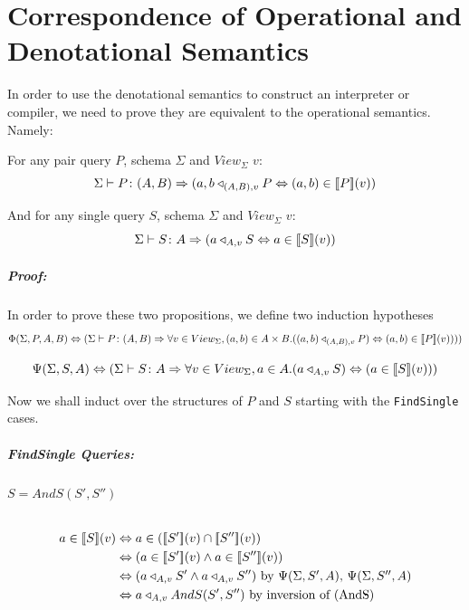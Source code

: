 \documentclass[12pt,a4paper,twoside,openright]{report}
\newcommand\codeName[1]{\texttt{#1}}
\newcommand{\db}[1]{{\bf [\![}#1{\bf ]\!]}}
\newcommand{\deno}[1]{\db{#1}(v)}
\newcommand{\typeRule}[2]{\Sigma\vdash #1 \colon #2}
\newcommand{\denoRule}[2]{#1 \in \deno{#2}}
\newcommand{\opRule}[3]{#1 \triangleleft_{#2, v} #3}
\newcommand{\phiRule}[3]{\Phi(\Sigma, #1, #2, #3)}
\newcommand{\psiRule}[2]{\Psi(\Sigma, #1, #2)}
\begin{document}
\prevdepth\tpd

\chapter{Correspondence of Operational and Denotational Semantics}
\label{DenoOper}
In order to use the denotational semantics to construct an interpreter or compiler, we need to prove they are equivalent to the operational semantics. Namely:

For any pair query $P$, schema $\Sigma$ and $View_{\Sigma}$ $v$:
\[
\typeRule{P}{(A, B)}\Rightarrow \opRule{(a, b}{(A, B)}{P} \Leftrightarrow \denoRule{(a, b)}{P})
\]

And for any single query $S$, schema $\Sigma$ and $View_{\Sigma}$ $v$: 
\[
\typeRule{S}{A}\Rightarrow \opRule{(a}{A}{S} \Leftrightarrow \denoRule{a}{S})
\]

\paragraph{Proof: }In order to prove these two propositions, we define two induction hypotheses
\[
\phiRule{P}{A}{B} \Leftrightarrow (\typeRule{P}{(A, B)} \Rightarrow \forall v \in View_{\Sigma}, (a, b) \in A \times B. (\opRule{(a, b)}{(A, B)}{P}) \Leftrightarrow \denoRule{(a, b)}{P})))
\]

\[
\psiRule{S}{A} \Leftrightarrow (\typeRule{S}{A} \Rightarrow \forall v \in View_{\Sigma}, a \in A. (\opRule{a}{A}{S}) \Leftrightarrow (\denoRule{a}{S}))
\]

Now we shall induct over the structures of $P$ and $S$ starting with the \codeName{FindSingle} cases.

\paragraph{FindSingle Queries:}

\subparagraph{$S = AndS(S', S'')$}
\begin{equation} \label{case AndS}
\begin{split}
\denoRule{a}{S} & \Leftrightarrow a \in (\deno{S'} \cap \deno{S''}) \\
				& \Leftrightarrow (\denoRule{a}{S'} \wedge \denoRule{a}{S''}) \\
				& \Leftrightarrow (\opRule{a}{A}{S'} \wedge \opRule{a}{A}{S''}) \mbox{ by $\psiRule{S'}{A}$, $\psiRule{S''}{A}$}\\
				& \Leftrightarrow \opRule{a}{A}{AndS(S', S'')} \mbox{ by inversion of (AndS)}
\end{split}
\end{equation}
\end{document}
